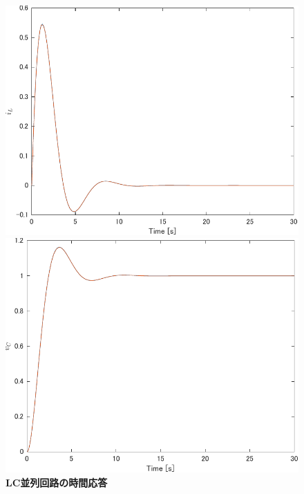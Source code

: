 \documentclass[tombow,dvipdfmx]{corona-a5-1.1}
\begin{document}
{\begin{例}[簡単な微分代数方程式の数値解法]
\begin{figure}[t]
  \centering
  {
    \begin{minipage}{0.49\linewidth}
      \centering
      \includegraphics[width = 1.0\linewidth]{figs/i_L}
    \end{minipage}
    \begin{minipage}{0.49\linewidth}
      \centering
      \includegraphics[width = 1.0\linewidth]{figs/v_C}
    \end{minipage}
    \medskip
    \caption{\textbf{LC並列回路の時間応答}
    }
    \label{fig:solution_dae}
  }
  \medskip
\end{figure}


\end{例}}
\end{document}
